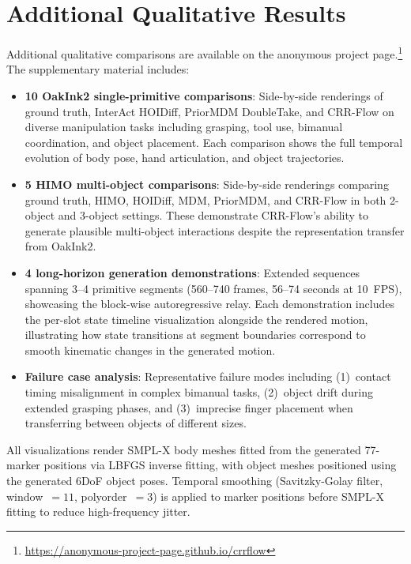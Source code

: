 \documentclass[sigconf, screen, review, anonymous]{acmart}
\begin{document}
\section{Additional Qualitative Results}
\label{sec:qualitative}

Additional qualitative comparisons are available on the anonymous project page.\footnote{\url{https://anonymous-project-page.github.io/crrflow}} The supplementary material includes:

\begin{itemize}
  \item \textbf{10 OakInk2 single-primitive comparisons}: Side-by-side renderings of ground truth, InterAct HOIDiff, PriorMDM DoubleTake, and CRR-Flow on diverse manipulation tasks including grasping, tool use, bimanual coordination, and object placement. Each comparison shows the full temporal evolution of body pose, hand articulation, and object trajectories.

  \item \textbf{5 HIMO multi-object comparisons}: Side-by-side renderings comparing ground truth, HIMO, HOIDiff, MDM, PriorMDM, and CRR-Flow in both 2-object and 3-object settings. These demonstrate CRR-Flow's ability to generate plausible multi-object interactions despite the representation transfer from OakInk2.

  \item \textbf{4 long-horizon generation demonstrations}: Extended sequences spanning 3--4 primitive segments (560--740 frames, 56--74 seconds at 10~FPS), showcasing the block-wise autoregressive relay. Each demonstration includes the per-slot state timeline visualization alongside the rendered motion, illustrating how state transitions at segment boundaries correspond to smooth kinematic changes in the generated motion.

  \item \textbf{Failure case analysis}: Representative failure modes including (1)~contact timing misalignment in complex bimanual tasks, (2)~object drift during extended grasping phases, and (3)~imprecise finger placement when transferring between objects of different sizes.
\end{itemize}

All visualizations render SMPL-X body meshes fitted from the generated 77-marker positions via LBFGS inverse fitting, with object meshes positioned using the generated 6DoF object poses. Temporal smoothing (Savitzky-Golay filter, window~$= 11$, polyorder~$= 3$) is applied to marker positions before SMPL-X fitting to reduce high-frequency jitter.
\end{document}
